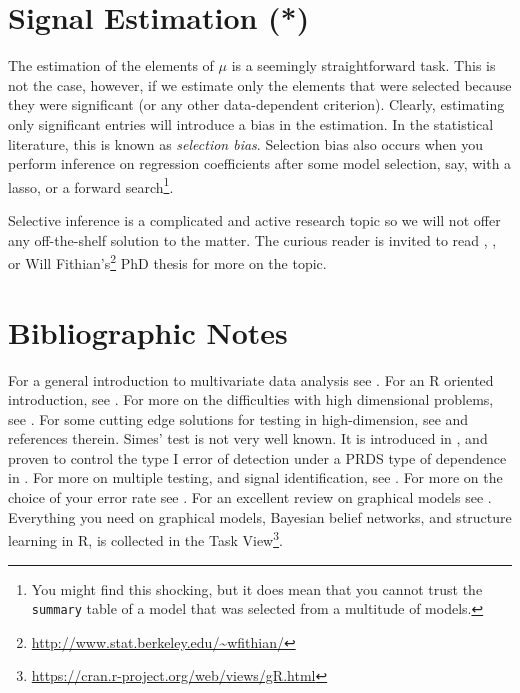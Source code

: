 \documentclass[]{book}
\renewcommand{\href}[2]{#2\footnote{\url{#1}}}
\theoremstyle{definition}
\theoremstyle{definition}
\theoremstyle{definition}
\theoremstyle{remark}
\begin{document}
\hypertarget{signal-estimation}{%
\section{Signal Estimation (*)}\label{signal-estimation}}

The estimation of the elements of \(\mu\) is a seemingly straightforward task.
This is not the case, however, if we estimate only the elements that were selected because they were significant (or any other data-dependent criterion).
Clearly, estimating only significant entries will introduce a bias in the estimation.
In the statistical literature, this is known as \emph{selection bias}.
Selection bias also occurs when you perform inference on regression coefficients after some model selection, say, with a lasso, or a forward search\footnote{You might find this shocking, but it does mean that you cannot trust the \texttt{summary} table of a model that was selected from a multitude of models.}.

Selective inference is a complicated and active research topic so we will not offer any off-the-shelf solution to the matter.
The curious reader is invited to read \citet{rosenblatt2014selective}, \citet{javanmard2014confidence}, or \href{http://www.stat.berkeley.edu/~wfithian/}{Will Fithian's} PhD thesis \citep{fithian2015topics} for more on the topic.

\hypertarget{bibliographic-notes-7}{%
\section{Bibliographic Notes}\label{bibliographic-notes-7}}

For a general introduction to multivariate data analysis see \citet{anderson2004introduction}.
For an R oriented introduction, see \citet{everitt2011introduction}.
For more on the difficulties with high dimensional problems, see \citet{bai1996effect}.
For some cutting edge solutions for testing in high-dimension, see \citet{rosenblatt2016better} and references therein.
Simes' test is not very well known. It is introduced in \citet{simes1986improved}, and proven to control the type I error of detection under a PRDS type of dependence in \citet{benjamini2001control}.
For more on multiple testing, and signal identification, see \citet{efron2012large}.
For more on the choice of your error rate see \citet{rosenblatt2013practitioner}.
For an excellent review on graphical models see \citet{kalisch2014causal}.
Everything you need on graphical models, Bayesian belief networks, and structure learning in R, is collected in the \href{https://cran.r-project.org/web/views/gR.html}{Task View}.
\end{document}
